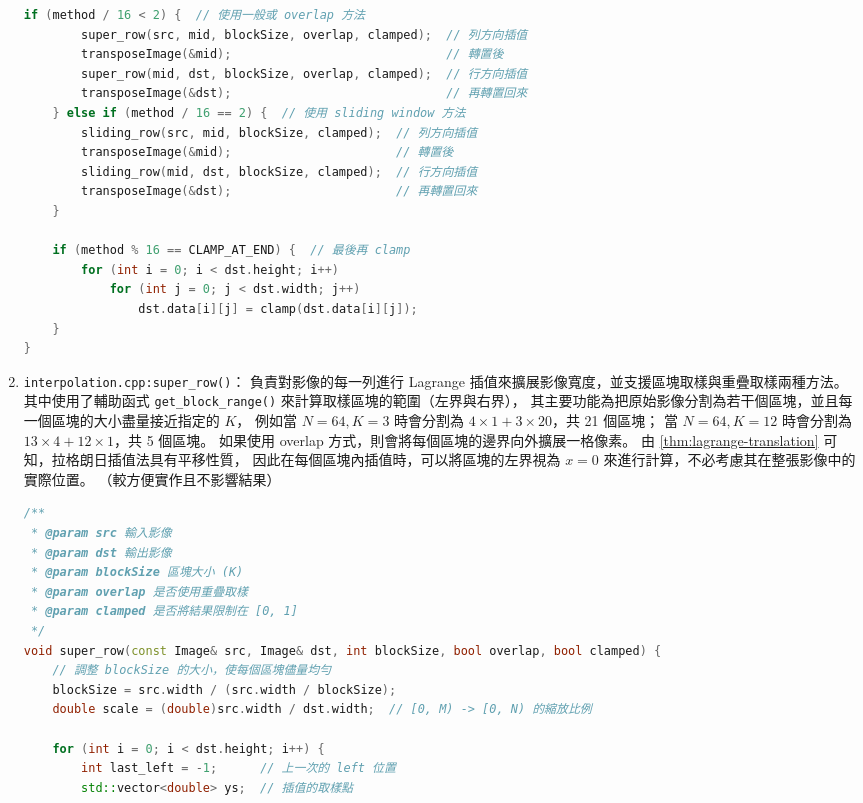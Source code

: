 \documentclass[a4paper,  10pt, oneside, fleqn]{article}
\begin{document}
\begin{enumerate}
\begin{lstlisting}[language=C++]
    if (method / 16 < 2) {  // 使用一般或 overlap 方法
        super_row(src, mid, blockSize, overlap, clamped);  // 列方向插值
        transposeImage(&mid);                              // 轉置後
        super_row(mid, dst, blockSize, overlap, clamped);  // 行方向插值
        transposeImage(&dst);                              // 再轉置回來
    } else if (method / 16 == 2) {  // 使用 sliding window 方法
        sliding_row(src, mid, blockSize, clamped);  // 列方向插值
        transposeImage(&mid);                       // 轉置後
        sliding_row(mid, dst, blockSize, clamped);  // 行方向插值
        transposeImage(&dst);                       // 再轉置回來
    }

    if (method % 16 == CLAMP_AT_END) {  // 最後再 clamp
        for (int i = 0; i < dst.height; i++)
            for (int j = 0; j < dst.width; j++)
                dst.data[i][j] = clamp(dst.data[i][j]);
    }
}
    \end{lstlisting}

    \item \lstinline|interpolation.cpp:super_row()|：
          負責對影像的每一列進行 Lagrange 插值來擴展影像寬度，並支援區塊取樣與重疊取樣兩種方法。
          其中使用了輔助函式 \lstinline|get_block_range()| 來計算取樣區塊的範圍（左界與右界），
          其主要功能為把原始影像分割為若干個區塊，並且每一個區塊的大小盡量接近指定的 $K$，
          例如當 $N = 64, K = 3$ 時會分割為 $4 \times 1 + 3 \times 20$，共 21 個區塊；
          當 $N = 64, K = 12$ 時會分割為 $13 \times 4 + 12 \times 1$，共 5 個區塊。
          如果使用 overlap 方式，則會將每個區塊的邊界向外擴展一格像素。
          由 \autoref{thm:lagrange-translation} 可知，拉格朗日插值法具有平移性質，
          因此在每個區塊內插值時，可以將區塊的左界視為 $x=0$ 來進行計算，不必考慮其在整張影像中的實際位置。
          （較方便實作且不影響結果）
          \begin{lstlisting}[language=C++]
/**
 * @param src 輸入影像
 * @param dst 輸出影像
 * @param blockSize 區塊大小 (K)
 * @param overlap 是否使用重疊取樣
 * @param clamped 是否將結果限制在 [0, 1]
 */
void super_row(const Image& src, Image& dst, int blockSize, bool overlap, bool clamped) {
    // 調整 blockSize 的大小，使每個區塊儘量均勻
    blockSize = src.width / (src.width / blockSize);
    double scale = (double)src.width / dst.width;  // [0, M) -> [0, N) 的縮放比例

    for (int i = 0; i < dst.height; i++) {
        int last_left = -1;      // 上一次的 left 位置
        std::vector<double> ys;  // 插值的取樣點


\end{lstlisting}
\end{enumerate}
\end{document}

